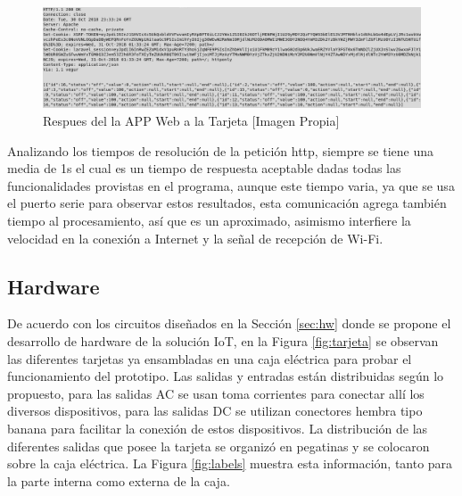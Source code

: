 \begin{figure}[!t]
	\centering
	\caption{Respues del la APP Web a la Tarjeta [Imagen Propia]}
	\label{fig:httprqstesp}
	\includegraphics[width=0.9\linewidth]{Imagenes/HTTPRqstesp}
\end{figure}

Analizando los tiempos de resolución de la petición http, siempre se tiene una media de 1s el cual es un tiempo de respuesta aceptable dadas todas las funcionalidades provistas en el programa, aunque este tiempo varia, ya que se usa el puerto serie para observar estos resultados, esta comunicación agrega también tiempo al procesamiento, así que es un aproximado, asimismo interfiere la velocidad en la conexión a Internet y la señal de recepción de Wi-Fi.

\subsection{Hardware}

De acuerdo con los circuitos diseñados en la Sección \ref{sec:hw} donde se propone el desarrollo de hardware de la solución IoT, en la Figura \ref{fig:tarjeta} se observan las diferentes tarjetas ya ensambladas en una caja eléctrica para probar el funcionamiento del prototipo. Las salidas y entradas están distribuidas según lo propuesto, para las salidas AC se usan toma corrientes para conectar allí los diversos dispositivos, para las salidas DC se utilizan conectores hembra tipo banana para facilitar la conexión de estos dispositivos. La distribución de las diferentes salidas que posee la tarjeta se organizó en pegatinas y se colocaron sobre la caja eléctrica. La Figura \ref{fig:labels} muestra esta información, tanto para la parte interna como externa de la caja.\\

